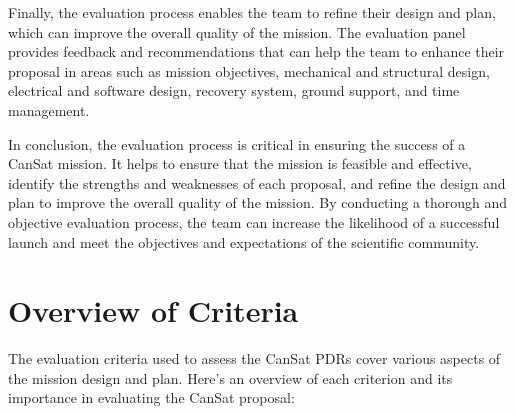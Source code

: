 \documentclass[11pt]{article}
\begin{document}
Finally, the evaluation process enables the team to refine their design and plan, which can improve the overall quality of the mission. The evaluation panel provides feedback and recommendations that can help the team to enhance their proposal in areas such as mission objectives, mechanical and structural design, electrical and software design, recovery system, ground support, and time management. 

In conclusion, the evaluation process is critical in ensuring the success of a CanSat mission. It helps to ensure that the mission is feasible and effective, identify the strengths and weaknesses of each proposal, and refine the design and plan to improve the overall quality of the mission. By conducting a thorough and objective evaluation process, the team can increase the likelihood of a successful launch and meet the objectives and expectations of the scientific community.

\section{Overview of Criteria}
The evaluation criteria used to assess the CanSat PDRs cover various aspects of the mission design and plan. Here's an overview of each criterion and its importance in evaluating the CanSat proposal:
\end{document}
